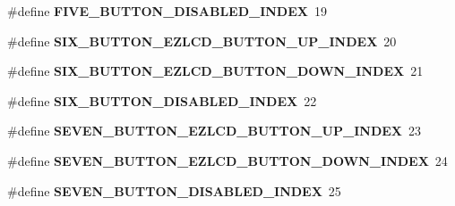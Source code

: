 \begin{DoxyCompactItemize}
\item 
\hypertarget{group__ez_l_c_d__103__user__config_ga1bfed75f2208a3ec73b48da90bffca04}{\#define {\bfseries F\-I\-V\-E\-\_\-\-B\-U\-T\-T\-O\-N\-\_\-\-D\-I\-S\-A\-B\-L\-E\-D\-\_\-\-I\-N\-D\-E\-X}~19}\label{group__ez_l_c_d__103__user__config_ga1bfed75f2208a3ec73b48da90bffca04}

\item 
\hypertarget{group__ez_l_c_d__103__user__config_gad0935a9b14e14ee3dfa03f43e92c1cd0}{\#define {\bfseries S\-I\-X\-\_\-\-B\-U\-T\-T\-O\-N\-\_\-\-E\-Z\-L\-C\-D\-\_\-\-B\-U\-T\-T\-O\-N\-\_\-\-U\-P\-\_\-\-I\-N\-D\-E\-X}~20}\label{group__ez_l_c_d__103__user__config_gad0935a9b14e14ee3dfa03f43e92c1cd0}

\item 
\hypertarget{group__ez_l_c_d__103__user__config_ga7bc8b83ee894459f6fc5ffbe633c4226}{\#define {\bfseries S\-I\-X\-\_\-\-B\-U\-T\-T\-O\-N\-\_\-\-E\-Z\-L\-C\-D\-\_\-\-B\-U\-T\-T\-O\-N\-\_\-\-D\-O\-W\-N\-\_\-\-I\-N\-D\-E\-X}~21}\label{group__ez_l_c_d__103__user__config_ga7bc8b83ee894459f6fc5ffbe633c4226}

\item 
\hypertarget{group__ez_l_c_d__103__user__config_ga1423f896fe35c0ecf6eeaee9167aa4d7}{\#define {\bfseries S\-I\-X\-\_\-\-B\-U\-T\-T\-O\-N\-\_\-\-D\-I\-S\-A\-B\-L\-E\-D\-\_\-\-I\-N\-D\-E\-X}~22}\label{group__ez_l_c_d__103__user__config_ga1423f896fe35c0ecf6eeaee9167aa4d7}

\item 
\hypertarget{group__ez_l_c_d__103__user__config_ga8f45a86bf6fcba36698319b27c1795b5}{\#define {\bfseries S\-E\-V\-E\-N\-\_\-\-B\-U\-T\-T\-O\-N\-\_\-\-E\-Z\-L\-C\-D\-\_\-\-B\-U\-T\-T\-O\-N\-\_\-\-U\-P\-\_\-\-I\-N\-D\-E\-X}~23}\label{group__ez_l_c_d__103__user__config_ga8f45a86bf6fcba36698319b27c1795b5}

\item 
\hypertarget{group__ez_l_c_d__103__user__config_gab4cfebc00dfa571379661f6aee5c1c08}{\#define {\bfseries S\-E\-V\-E\-N\-\_\-\-B\-U\-T\-T\-O\-N\-\_\-\-E\-Z\-L\-C\-D\-\_\-\-B\-U\-T\-T\-O\-N\-\_\-\-D\-O\-W\-N\-\_\-\-I\-N\-D\-E\-X}~24}\label{group__ez_l_c_d__103__user__config_gab4cfebc00dfa571379661f6aee5c1c08}

\item 
\hypertarget{group__ez_l_c_d__103__user__config_ga9f4f660b415e952404a0451b71bfeeca}{\#define {\bfseries S\-E\-V\-E\-N\-\_\-\-B\-U\-T\-T\-O\-N\-\_\-\-D\-I\-S\-A\-B\-L\-E\-D\-\_\-\-I\-N\-D\-E\-X}~25}\label{group__ez_l_c_d__103__user__config_ga9f4f660b415e952404a0451b71bfeeca}


\end{DoxyCompactItemize}
